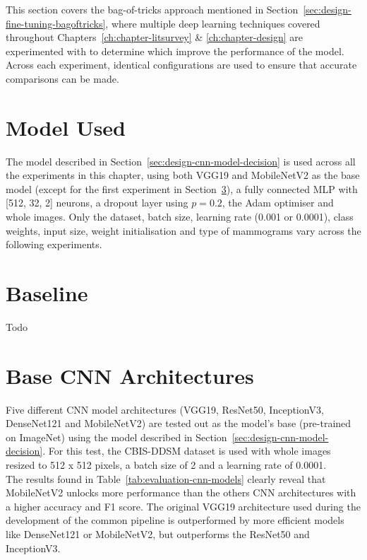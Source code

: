 This section covers the bag-of-tricks approach mentioned in Section~\ref{sec:design-fine-tuning-bagoftricks}, where multiple deep learning techniques covered throughout Chapters~\ref{ch:chapter-litsurvey} \& \ref{ch:chapter-design} are experimented with to determine which improve the performance of the model. Across each experiment, identical configurations are used to ensure that accurate comparisons can be made.


\section{Model Used}

The model described in Section~\ref{sec:design-cnn-model-decision} is used across all the experiments in this chapter, using both VGG19 and MobileNetV2 as the base model (except for the first experiment in Section~\ref{sec:evaluation-cnn-model-experiment}), a fully connected MLP with [512, 32, 2] neurons, a dropout layer using $p=0.2$, the Adam optimiser and whole images. Only the dataset, batch size, learning rate (0.001 or 0.0001), class weights, input size, weight initialisation and type of mammograms vary across the following experiments.


\section{Baseline}

Todo


\section{Base CNN Architectures}
\label{sec:evaluation-cnn-model-experiment}

Five different CNN model architectures (VGG19, ResNet50, InceptionV3, DenseNet121 and MobileNetV2) are tested out as the model's base (pre-trained on ImageNet) using the model described in Section~\ref{sec:design-cnn-model-decision}. For this test, the CBIS-DDSM dataset is used with whole images resized to 512 x 512 pixels, a batch size of 2 and a learning rate of 0.0001.\\

The results found in Table~\ref{tab:evaluation-cnn-models} clearly reveal that MobileNetV2 unlocks more performance than the others CNN architectures with a higher accuracy and F1 score. The original VGG19 architecture used during the development of the common pipeline is outperformed by more efficient models like DenseNet121 or MobileNetV2, but outperforms the ResNet50 and InceptionV3.

